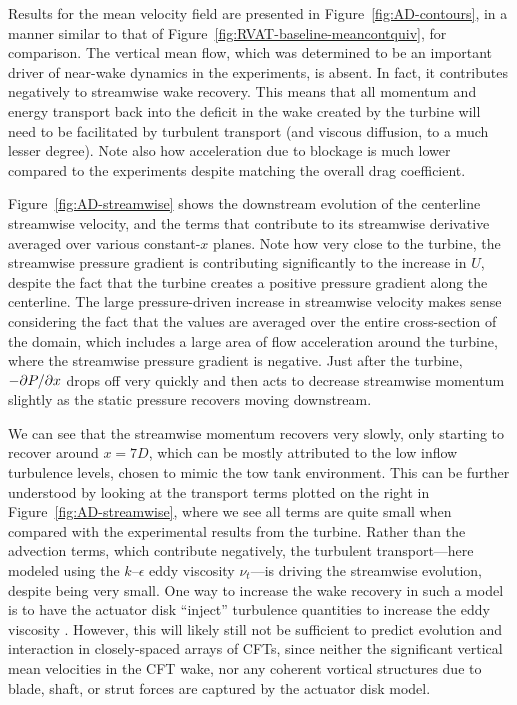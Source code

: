 Results for the mean velocity field are presented in
Figure~\ref{fig:AD-contours}, in a manner similar to that of
Figure~\ref{fig:RVAT-baseline-meancontquiv}, for comparison. The vertical mean
flow, which was determined to be an important driver of near-wake dynamics in
the experiments, is absent. In fact, it contributes negatively to streamwise
wake recovery. This means that all momentum and energy transport back into the
deficit in the wake created by the turbine will need to be facilitated by
turbulent transport (and viscous diffusion, to a much lesser degree). Note also
how acceleration due to blockage is much lower compared to the experiments
despite matching the overall drag coefficient.

Figure~\ref{fig:AD-streamwise} shows the downstream evolution of the centerline
streamwise velocity, and the terms that contribute to its streamwise derivative
averaged over various constant-$x$ planes. Note how very close to the turbine,
the streamwise pressure gradient is contributing significantly to the increase
in $U$, despite the fact that the turbine creates a positive pressure gradient
along the centerline. The large pressure-driven increase in streamwise velocity
makes sense considering the fact that the values are averaged over the entire
cross-section of the domain, which includes a large area of flow acceleration
around the turbine, where the streamwise pressure gradient is negative. Just
after the turbine, $-\partial P / \partial x$ drops off very quickly and then acts to
decrease streamwise momentum slightly as the static pressure recovers moving
downstream.

We can see that the streamwise momentum recovers very slowly, only starting to
recover around $x=7D$, which can be mostly attributed to the low inflow
turbulence levels, chosen to mimic the tow tank environment. This can be further
understood by looking at the transport terms plotted on the right in
Figure~\ref{fig:AD-streamwise}, where we see all terms are quite small when
compared with the experimental results from the turbine. Rather than the
advection terms, which contribute negatively, the turbulent transport---here
modeled using the $k$--$\epsilon$ eddy viscosity $\nu_t$---is driving the
streamwise evolution, despite being very small. One way to increase the wake
recovery in such a model is to have the actuator disk ``inject'' turbulence
quantities to increase the eddy viscosity \cite{James2011, Nelson2013}. However,
this will likely still not be sufficient to predict evolution and interaction in
closely-spaced arrays of CFTs, since neither the significant vertical mean 
velocities in the CFT wake, nor any coherent vortical structures 
due to blade, shaft, or strut forces are captured by the actuator disk model.

